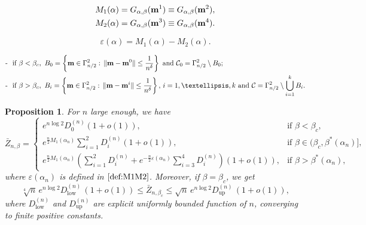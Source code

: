 \documentclass[10pt,a4paper]{amsart}
\newtheorem{proposition}{Proposition}
\def \bm {{\bf m}}
\begin{document}
\begin{equation}\label{Max}
\begin{split}
&M_1(\alpha)=G_{\alpha,\beta}(\bm^1)\equiv G_{\alpha,\beta}(\bm^2),\\
&M_2(\alpha)=G_{\alpha,\beta}(\bm^3)\equiv G_{\alpha,\beta}(\bm^4).
\end{split}
\end{equation}

\begin{equation}
\label{def:M1M2}
 \varepsilon(\alpha)= M_1(\alpha)-M_2(\alpha).
\end{equation}

\begin{equation} \label{def-intorni}
\begin{split}
\mbox{-\,\, if } \beta< \beta_c, \,\,\,   &B_{0}= \left \{ \bm \in \Gamma_{n/2}^2: \, \|\bm-\bm^0\| \leq \frac{1}{n^\delta} \right \} \,\, \text{and}
    \,\, \mathcal{C}_0=\Gamma_{n/2}^2 \setminus B_0;\\
\mbox{-\,\, if } \beta> \beta_c, \,\,\,    & B_{i}= \left \{ \bm \in \Gamma_{n/2}^2: \, \|\bm-\bm^i\| \leq \frac{1}{n^\delta} \right \},\, i=1,\ldots, k \,\,\text{and}
    \,\, \mathcal{C}=\Gamma_{n/2}^2 \setminus \bigcup_{i=1}^k B_i.  
\end{split}
\end{equation}

\begin{proposition}\label{Z_approx} 
For $n$ large enough, we have
\begin{equation*}
\bar{Z}_{n,\beta}=
\begin{cases}
e^{n\log2} D_0^{(n)}(1+o(1)), & \text{if }\beta<\beta_c, \\[5pt]
e^{\frac{n}{2} M_1(\alpha_n)} \sum_{i=1}^2 D_i^{(n)} (1+o(1)),& \text{if } \beta  \in \big(\beta_c,\beta^*(\alpha_n)\big], \\[5pt]
    e^{\frac{n}{2} M_1(\alpha_n)} \left (\sum_{i=1}^2 D_i^{(n)}+e^{-\frac{n}{2} \varepsilon(\alpha_n)} \sum_{i=3}^4 D_i^{(n)} \right ) (1+o(1)),  & \text{if } \beta>\beta^*(\alpha_n),
\end{cases} 
\end{equation*}
where $\varepsilon(\alpha_n)$ is defined in $\eqref{def:M1M2}$.
Moreover, if $\beta=\beta_c$, we get
\begin{equation}\label{Zcrit-bound}
\sqrt[4]{n} \, e^{n\log2}  D_{\text{low}}^{(n)}\,(1+o(1))\le \bar{Z}_{n,\beta_c}\le
\sqrt{n} \, e^{n\log2}  D_{\text{up}}^{(n)}\,(1+o(1)), 
\end{equation}
where $D_{\text{low}}^{(n)}$ and $D_{\text{up}}^{(n)}$ are explicit 
uniformly bounded function of $n$, converging to finite positive constants.
\end{proposition}
\end{document}
